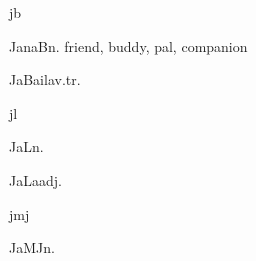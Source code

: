 \begin{multicols*}{2}
\begin{dictroot}{j}{b}
\begin{dictentry}{JanaB}{n.}
{            friend, buddy, pal, companion
        }
    \end{dictentry}
    \begin{dictentry}{JaBaila}{v.tr.}\label{word:JaBaila}
    \end{dictentry}
\end{dictroot}

\begin{dictroot}{j}{l}\label{root:J_L}
    \begin{dictentry}{JaL}{n.}\label{word:JaL}
    \end{dictentry}
    \begin{dictentry}{JaLa}{adj.}\label{word:JaLa}
    \end{dictentry}
\end{dictroot}

\begin{dictroot}{j}{mj}\label{root:J_MJ}
    \begin{dictentry}{JaMJ}{n.}\label{word:JaMJ}
    \end{dictentry}
\end{dictroot}


\end{multicols*}
